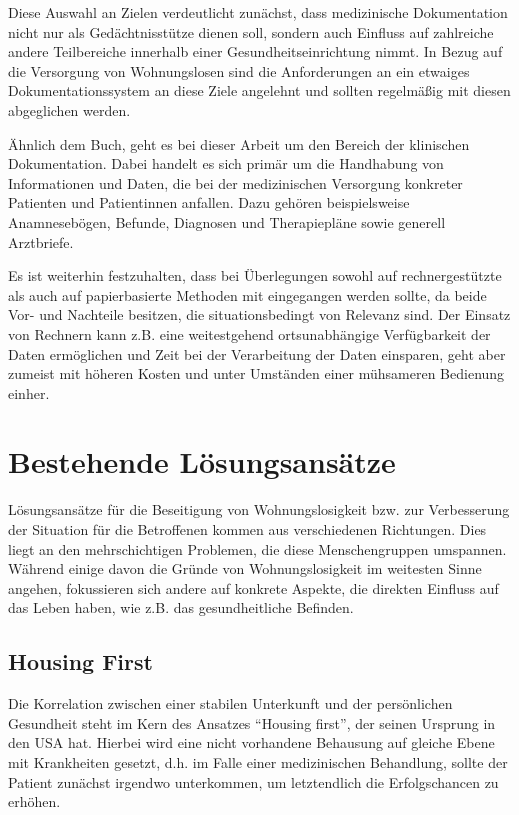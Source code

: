 Diese Auswahl an Zielen verdeutlicht zunächst, dass medizinische Dokumentation nicht nur als Gedächtnisstütze dienen soll, sondern auch Einfluss auf zahlreiche andere Teilbereiche innerhalb einer Gesundheitseinrichtung nimmt. In Bezug auf die Versorgung von Wohnungslosen sind die Anforderungen an ein etwaiges Dokumentationssystem an diese Ziele angelehnt und sollten regelmäßig mit diesen abgeglichen werden.

Ähnlich dem Buch, geht es bei dieser Arbeit um den Bereich der klinischen Dokumentation. Dabei handelt es sich primär um die Handhabung von Informationen und Daten, die bei der medizinischen Versorgung konkreter Patienten und Patientinnen anfallen. Dazu gehören beispielsweise Anamnesebögen, Befunde, Diagnosen und Therapiepläne sowie generell Arztbriefe.

Es ist weiterhin festzuhalten, dass bei Überlegungen sowohl auf rechnergestützte als auch auf papierbasierte Methoden mit eingegangen werden sollte, da beide Vor- und Nachteile besitzen, die situationsbedingt von Relevanz sind. Der Einsatz von Rechnern kann z.B. eine weitestgehend ortsunabhängige Verfügbarkeit der Daten ermöglichen und Zeit bei der Verarbeitung der Daten einsparen, geht aber zumeist mit höheren Kosten und unter Umständen einer mühsameren Bedienung einher.


\section{Bestehende Lösungsansätze}

Lösungsansätze für die Beseitigung von Wohnungslosigkeit bzw. zur Verbesserung der Situation für die Betroffenen kommen aus verschiedenen Richtungen. Dies liegt an den mehrschichtigen Problemen, die diese Menschengruppen umspannen. Während einige davon die Gründe von Wohnungslosigkeit im weitesten Sinne angehen, fokussieren sich andere auf konkrete Aspekte, die direkten Einfluss auf das Leben haben, wie z.B. das gesundheitliche Befinden.

\subsection{Housing First}

Die Korrelation zwischen einer stabilen Unterkunft und der persönlichen Gesundheit steht im Kern des Ansatzes \enquote{Housing first}, der seinen Ursprung in den USA hat. Hierbei wird eine nicht vorhandene Behausung auf gleiche Ebene mit Krankheiten gesetzt, d.h. im Falle einer medizinischen Behandlung, sollte der Patient zunächst irgendwo unterkommen, um letztendlich die Erfolgschancen zu erhöhen. 

